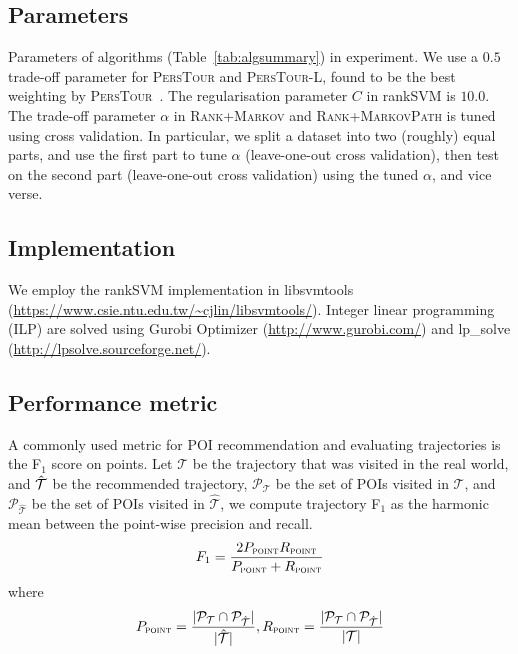 \subsection{Parameters}
Parameters of algorithms (Table~\ref{tab:algsummary}) in experiment.
We use a $0.5$ trade-off parameter for \textsc{PersTour} and \textsc{PersTour-L}, found to be the best weighting by \textsc{PersTour}~\cite{ijcai15}.
The regularisation parameter $C$ in rankSVM is $10.0$.
The trade-off parameter $\alpha$ in \textsc{Rank+Markov} and \textsc{Rank+MarkovPath} is tuned using cross validation.
In particular, we split a dataset into two (roughly) equal parts, and use the first part to tune $\alpha$ (leave-one-out cross validation),
then test on the second part (leave-one-out cross validation) using the tuned $\alpha$, and vice verse. 

\subsection{Implementation}
We employ the rankSVM implementation in libsvmtools (\url{https://www.csie.ntu.edu.tw/~cjlin/libsvmtools/}).
Integer linear programming (ILP) are solved using Gurobi Optimizer (\url{http://www.gurobi.com/})
and lp\_solve (\url{http://lpsolve.sourceforge.net/}).

\subsection{Performance metric}
A commonly used metric for POI recommendation and evaluating trajectories is
the F$_1$ score on points.
Let $\mathcal{T}$ be the trajectory that was visited in the real world,
and $\hat{\cal T}$ be the recommended trajectory,
$\mathcal{P}_{\mathcal{T}}$ be the set of POIs visited in $\mathcal{T}$,
and $\mathcal{P}_{\hat{\mathcal{T}}}$ be the set of POIs visited in $\hat{\mathcal{T}}$,
we compute trajectory F$_1$ as the harmonic mean between the point-wise precision and recall.
\begin{displaymath}
F_1= \frac{2  P_{\textsc{point}}  R_{\textsc{point}}}
          {P_{\textsc{point}} + R_{\textsc{point}}}
\end{displaymath}
where
\vspace{-1.1em}
\begin{displaymath}%
P_{\textsc{point}} = \frac{|\mathcal{P}_{\mathcal{T}} \cap \mathcal{P}_{\hat{\mathcal{T}}}|}
                          {|\hat{\mathcal{T}}|},
R_{\textsc{point}} = \frac{|\mathcal{P}_{\mathcal{T}} \cap \mathcal{P}_{\hat{\mathcal{T}}}|}
                          {|\mathcal{T}|}
\end{displaymath}

